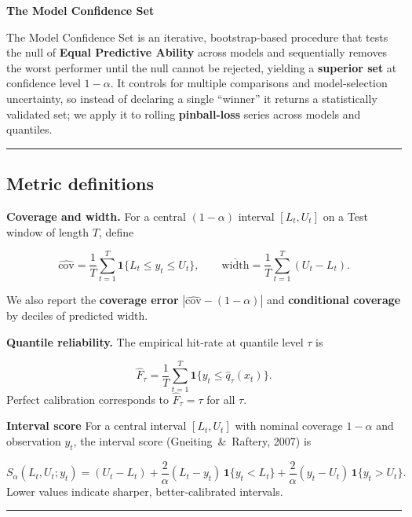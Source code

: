 \documentclass[
  a4paper,
  DIV=11,
  numbers=noendperiod]{scrreprt}
\begin{document}
\textbf{The Model Confidence Set}

The Model Confidence Set is an iterative, bootstrap-based procedure that
tests the null of \textbf{Equal Predictive Ability} across models and
sequentially removes the worst performer until the null cannot be
rejected, yielding a \textbf{superior set} at confidence level
\(1-\alpha\). It controls for multiple comparisons and model-selection
uncertainty, so instead of declaring a single ``winner'' it returns a
statistically validated set; we apply it to rolling
\textbf{pinball-loss} series across models and quantiles.

\begin{center}\rule{0.5\linewidth}{0.5pt}\end{center}

\subsection{Metric definitions}\label{app-m5-metrics}

\textbf{Coverage and width.} For a central \((1-\alpha)\) interval
\([L_t,U_t]\) on a Test window of length \(T\), define

\[
\widehat{\mathrm{cov}} = \frac{1}{T} \sum_{t=1}^{T} \mathbf{1}\{ L_t \le y_t \le U_t \},
\qquad
\overline{\mathrm{width}} = \frac{1}{T} \sum_{t=1}^{T} (U_t - L_t).
\]

We also report the \textbf{coverage error}
\(|\widehat{\mathrm{cov}} - (1-\alpha)|\) and \textbf{conditional
coverage} by deciles of predicted width.

\textbf{Quantile reliability.} The empirical hit‑rate at quantile level
\(\tau\) is

\[
\widehat F_{\tau} = \frac{1}{T} \sum_{t=1}^{T} \mathbf{1}\{ y_t \le \widehat q_{\tau}(x_t) \}.
\] Perfect calibration corresponds to \(\widehat F_{\tau} = \tau\) for
all \(\tau\).

\textbf{Interval score} For a central interval \([L_t,U_t]\) with
nominal coverage \(1-\alpha\) and observation \(y_t\), the interval
score (Gneiting~\&~Raftery, 2007) is

\[
S_{\alpha}(L_t,U_t;y_t) = (U_t-L_t) + \frac{2}{\alpha} (L_t - y_t)\,\mathbf{1}\{ y_t < L_t \} + \frac{2}{\alpha} (y_t - U_t)\,\mathbf{1}\{ y_t > U_t \}.
\] Lower values indicate sharper, better‑calibrated intervals.

\begin{center}\rule{0.5\linewidth}{0.5pt}\end{center}
\end{document}
